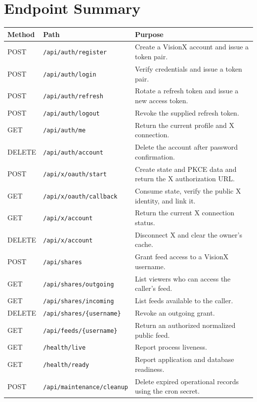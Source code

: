 \documentclass[11pt,a4paper]{report}
\newcommand{\code}[1]{\texttt{#1}}
\begin{document}
\section{Endpoint Summary}
\begin{longtable}{L{0.13\textwidth} L{0.34\textwidth} L{0.45\textwidth}}
\toprule
\textbf{Method} & \textbf{Path} & \textbf{Purpose} \\
\midrule
\endhead
POST & \code{/api/auth/register} & Create a VisionX account and issue a token
pair. \\
POST & \code{/api/auth/login} & Verify credentials and issue a token pair. \\
POST & \code{/api/auth/refresh} & Rotate a refresh token and issue a new
access token. \\
POST & \code{/api/auth/logout} & Revoke the supplied refresh token. \\
GET & \code{/api/auth/me} & Return the current profile and X connection. \\
DELETE & \code{/api/auth/account} & Delete the account after password
confirmation. \\
\midrule
POST & \code{/api/x/oauth/start} & Create state and PKCE data and return the X
authorization URL. \\
GET & \code{/api/x/oauth/callback} & Consume state, verify the public X
identity, and link it. \\
GET & \code{/api/x/account} & Return the current X connection status. \\
DELETE & \code{/api/x/account} & Disconnect X and clear the owner's cache. \\
\midrule
POST & \code{/api/shares} & Grant feed access to a VisionX username. \\
GET & \code{/api/shares/outgoing} & List viewers who can access the caller's
feed. \\
GET & \code{/api/shares/incoming} & List feeds available to the caller. \\
DELETE & \code{/api/shares/\{username\}} & Revoke an outgoing grant. \\
GET & \code{/api/feeds/\{username\}} & Return an authorized normalized public
feed. \\
\midrule
GET & \code{/health/live} & Report process liveness. \\
GET & \code{/health/ready} & Report application and database readiness. \\
POST & \code{/api/maintenance/cleanup} & Delete expired operational records
using the cron secret. \\
\bottomrule
\end{longtable}
\end{document}
